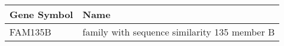 \begin{tabular}{ll}
\toprule
Gene Symbol &                                         Name \\
\midrule
    FAM135B & family with sequence similarity 135 member B \\
\bottomrule
\end{tabular}
